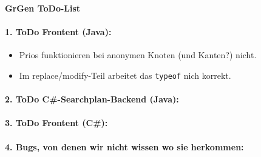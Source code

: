 \documentclass[12pt,a4paper]{article}
\begin{document}
\noindent
{\bf\Large GrGen ToDo-List}

\paragraph{1. ToDo Frontent (Java):}
\begin{itemize}
  \item Prios funktionieren bei anonymen Knoten (und Kanten?) nicht.
  \item Im replace/modify-Teil arbeitet das {\tt typeof} nich korrekt.
\end{itemize}
\vspace{0.5cm}

\paragraph{2. ToDo C\#-Searchplan-Backend (Java):}

\paragraph{3. ToDo Frontent (C\#):}

\paragraph{4. Bugs, von denen wir nicht wissen wo sie herkommen:}
\end{document}

